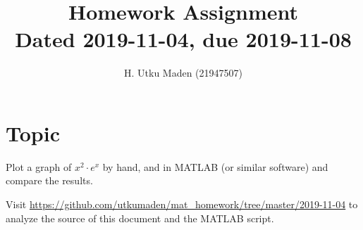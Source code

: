 \documentclass[a4paper]{article}
\title{
Homework Assignment\\
{\small Dated 2019-11-04, due 2019-11-08}
}
\author{H. Utku Maden (21947507)}
\begin{document}
    
\maketitle

\section{Topic}

Plot a graph of \(x^2\cdot e^x\) by hand, and in MATLAB (or similar software)
and compare the results.





{\small
\vspace{10mm}
Visit 
\url{https://github.com/utkumaden/mat_homework/tree/master/2019-11-04} to
analyze the source of this document and the MATLAB script.
}
\end{document}
